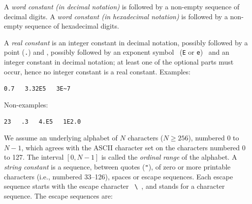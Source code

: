 A {\sl word constant (in decimal notation)} is   followed
by a non-empty sequence of decimal digits.
A {\sl word constant
(in hexadecimal notation)} is  followed by a non-empty
sequence of hexadecimal digits.

A {\sl real constant} is an integer constant in decimal notation,
possibly followed by a point ({\tt .}) and , possibly followed by an exponent symbol ~({\tt E} or {\tt e})~ and an integer
constant in decimal notation; at least one of the optional parts must occur, hence no integer
constant is a real constant.
Examples:
\begin{center}
  {\tt 0.7}~~~{\tt 3.32E5}~~~\verb(3E~7(~~~
\end{center}%
Non-examples:
\begin{center}
  {\tt 23}~~~{\tt .3}~~~{\tt 4.E5}~~~{\tt 1E2.0}~~~~~~
~~~
\end{center}%

We assume an underlying alphabet of $N$ characters ($N \geq 256$), numbered
     $0$ to $N-1$, which agrees with the ASCII character set on the characters
     numbered 0 to 127. The interval $[0, N-1]$ is called the {\sl ordinal range} of
     the alphabet.
A {\sl string constant} is a sequence, between quotes ({\tt "}), of zero or
more printable characters (i.e., numbered 33--126), spaces or escape 
sequences.
Each escape sequence starts with the
escape character ~\verb+\+~, and stands for a character sequence. The
escape sequences are:
\bigskip

